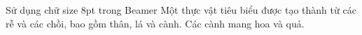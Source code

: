 \documentclass[8pt]{beamer}
\begin{document}
\begin{frame}{Sử dụng chữ size 8pt trong Beamer}
  \justifying
  Một thực vật tiêu biểu được tạo thành từ các rễ và các chồi, bao gồm thân, lá và cành. Các cành mang hoa và quả.
\end{frame}
\end{document}
